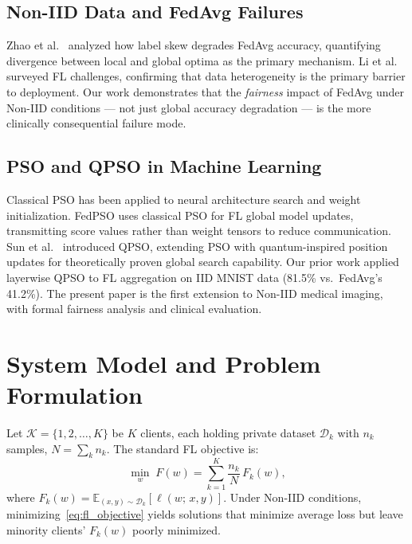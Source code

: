 \documentclass[conference]{IEEEtran}
\begin{document}
\subsection{Non-IID Data and FedAvg Failures}
Zhao et al.\ \cite{zhao2018} analyzed how label skew degrades FedAvg
accuracy, quantifying divergence between local and global optima as the
primary mechanism. Li et al.\ \cite{li2021survey} surveyed FL challenges,
confirming that data heterogeneity is the primary barrier to deployment.
Our work demonstrates that the \emph{fairness} impact of FedAvg under
Non-IID conditions — not just global accuracy degradation — is the more
clinically consequential failure mode.

\subsection{PSO and QPSO in Machine Learning}
Classical PSO \cite{kennedy1995} has been applied to neural architecture
search and weight initialization. FedPSO \cite{fedpso2021} uses classical PSO
for FL global model updates, transmitting score values rather than weight
tensors to reduce communication. Sun et al.\ \cite{sun2004qpso} introduced
QPSO, extending PSO with quantum-inspired position updates for theoretically
proven global search capability. Our prior work \cite{edla2025mnist}
applied layerwise QPSO to FL aggregation on IID MNIST data (81.5\% vs.\
FedAvg's 41.2\%). The present paper is the first extension to Non-IID medical
imaging, with formal fairness analysis and clinical evaluation.

\section{System Model and Problem Formulation}
\label{sec:problem}

Let $\mathcal{K} = \{1, 2, \ldots, K\}$ be $K$ clients, each holding private
dataset $\mathcal{D}_k$ with $n_k$ samples, $N = \sum_k n_k$. The standard
FL objective is:
\begin{equation}
    \min_{w}\; F(w) = \sum_{k=1}^{K} \frac{n_k}{N}\, F_k(w),
    \label{eq:fl_objective}
\end{equation}
where $F_k(w) = \mathbb{E}_{(x,y)\sim\mathcal{D}_k}[\ell(w;\,x,y)]$. Under
Non-IID conditions, minimizing~\eqref{eq:fl_objective} yields solutions that
minimize average loss but leave minority clients' $F_k(w)$ poorly minimized.
\end{document}
